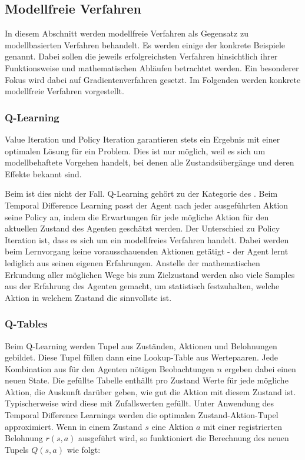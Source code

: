 \subsection{Modellfreie Verfahren}
In diesem Abschnitt werden modellfreie Verfahren als Gegensatz zu modellbasierten Verfahren behandelt. Es werden einige der konkrete Beispiele genannt. Dabei sollen die jeweils erfolgreichsten Verfahren hinsichtlich ihrer Funktionsweise und mathematischen Abläufen betrachtet werden. Ein besonderer Fokus wird dabei auf Gradientenverfahren gesetzt.
Im Folgenden werden konkrete modellfreie Verfahren vorgestellt.



\subsubsection{Q-Learning}\label{q-learning}
Value Iteration und Policy Iteration garantieren stets ein Ergebnis mit einer optimalen Lösung für ein Problem. Dies ist nur möglich, weil es sich um modellbehaftete Vorgehen handelt, bei denen alle Zustandsübergänge und deren Effekte bekannt sind.

Beim  ist dies nicht der Fall. Q-Learning gehört zu der Kategorie des . Beim Temporal Difference Learning passt der Agent nach jeder ausgeführten Aktion seine Policy an, indem die Erwartungen für jede mögliche Aktion für den aktuellen Zustand des Agenten geschätzt werden. Der Unterschied zu Policy Iteration ist, dass es sich um ein modellfreies Verfahren handelt. Dabei werden beim Lernvorgang keine vorausschauenden Aktionen getätigt - der Agent lernt lediglich aus seinen eigenen Erfahrungen. Anstelle der mathematischen Erkundung aller möglichen Wege bis zum Zielzustand werden also viele Samples aus der Erfahrung des Agenten gemacht, um statistisch festzuhalten, welche Aktion in welchem Zustand die sinnvollste ist.

\subsubsection{Q-Tables}
Beim Q-Learning werden Tupel aus Zuständen, Aktionen und Belohnungen gebildet. Diese Tupel füllen dann eine Lookup-Table aus Wertepaaren. Jede Kombination aus für den Agenten nötigen Beobachtungen $n$ ergeben dabei einen neuen State. Die gefüllte Tabelle enthällt pro Zustand Werte für jede mögliche Aktion, die Auskunft darüber geben, wie gut die Aktion mit diesem Zustand ist. Typischerweise wird diese  mit Zufallswerten gefüllt. Unter Anwendung des Temporal Difference Learnings werden die optimalen Zustand-Aktion-Tupel approximiert.
Wenn in einem Zustand $s$ eine Aktion $a$ mit einer registrierten Belohnung $r(s,a)$ ausgeführt wird, so funktioniert die Berechnung des neuen Tupels $Q(s,a)$ wie folgt:

